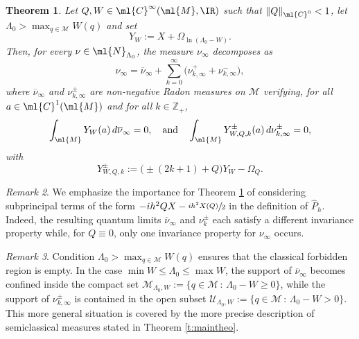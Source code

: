 \documentclass[10pt]{amsart}
\theoremstyle{plain}
\newtheorem{theo}{Theorem}[section]
\theoremstyle{definition}
\theoremstyle{remark}
\newtheorem{rema}[theo]{Remark}
\begin{document}
\begin{theo}
\label{t:simplified_theorem}
Let $Q,W\in\ml{C}^\infty(\ml{M},\IR)$ such that $\|Q\|_{\ml{C}^0}<1$, let $\Lambda_0 > \max_{q \in \mathcal{M}} W(q)$ and set
\begin{equation}\label{e:good-vectorfield}
Y_W:=X+\Omega_{\ln(\Lambda_0-W)}.
\end{equation}
Then, for every $\nu\in\ml{N}_{\Lambda_0}$, the measure $\nu_\infty$ decomposes as
\begin{equation}
\label{e:decomposition_nu}
\nu_\infty = \overline{\nu}_\infty + \sum_{k=0}^\infty \big(\nu^+_{k,\infty} + \nu_{k,\infty}^- \big),
\end{equation}
where $\overline{\nu}_\infty$ and $\nu_{k,\infty}^\pm$ are non-negative Radon measures on $\mathcal{M}$ verifying, for all $a\in\ml{C}^1(\ml{M})$ and for all $k\in\mathbb{Z}_+$,
\begin{equation}\label{e:invariance-base}
\int_{\ml{M}}Y_W(a) \, d\overline{\nu}_\infty=0,\quad\text{and}\quad\int_{\ml{M}}Y_{W,Q,k}^\pm(a) \, d\nu_{k,\infty}^\pm=0,
\end{equation}
with
\[
Y^\pm_{W,Q,k} := \big(\pm (2k + 1) + Q \big) Y_W-\Omega_Q.
\]
\end{theo}

\begin{rema}
\label{remark_type_perturbations} We emphasize the importance for Theorem \ref{t:simplified_theorem} of considering subprincipal terms of the form $-ih^2QX - \sfrac{ih^2X(Q)}{2}$ in the definition of $\widehat{P}_h$. Indeed, the resulting quantum limits $\overline{\nu}_\infty$ and $\nu_k^{\pm}$ each satisfy a different invariance property while, for $Q\equiv 0$, only one invariance property for $\nu_\infty$ occurs.
\end{rema}

\begin{rema}
Condition $\Lambda_0 > \max_{q \in \mathcal{M}} W(q)$ ensures that the classical forbidden region is empty. In the case $\min W \leq \Lambda_0 \leq \max W$, the support of $\overline{\nu}_\infty$ becomes confined inside the compact set $\mathcal{M}_{\Lambda_0,W} := \{ q \in \mathcal{M} \, : \, \Lambda_0 - W \geq 0 \}$, while the support of $\nu_{k,\infty}^\pm$ is contained in the open subset $\mathcal{U}_{\Lambda_0,W}:= \{ q \in \mathcal{M} \, : \, \Lambda_0 - W > 0 \}$. This more general situation is covered by the more precise description of semiclassical measures stated in Theorem \ref{t:maintheo}.
\end{rema}
\end{document}
